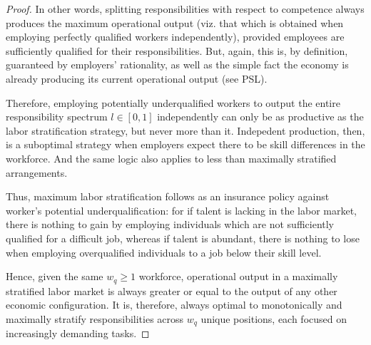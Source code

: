 \documentclass[hidelinks, nonatbib]{elsarticle}
\begin{document}
\begin{lemma}
\begin{proof}
        In other words, splitting responsibilities with respect to competence always produces the maximum operational output (viz. that which is obtained when employing perfectly qualified workers independently), provided employees are sufficiently qualified for their responsibilities. But, again, this is, by definition, guaranteed by employers' rationality, as well as the simple fact the economy is already producing its current operational output (see PSL). 
        
        Therefore, employing potentially underqualified workers to output the entire responsibility spectrum $l \in [0,1]$ independently can only be as productive as the labor stratification strategy, but never more than it. Indepedent production, then, is a suboptimal strategy when employers expect there to be skill differences in the workforce. And the same logic also applies to less than maximally stratified arrangements.
        
        Thus, maximum labor stratification follows as an insurance policy against worker's potential underqualification: for if talent is lacking in the labor market, there is nothing to gain by employing individuals which are not sufficiently qualified for a difficult job, whereas if talent is abundant, there is nothing to lose when employing overqualified individuals to a job below their skill level.

        Hence, given the same $w_q \geq 1$ workforce, operational output in a maximally stratified labor market is always greater or equal to the output of any other economic configuration. It is, therefore, always optimal to monotonically and maximally stratify responsibilities across $w_q$ unique positions, each focused on increasingly demanding tasks.
    \end{proof}
\end{lemma}
\end{document}
